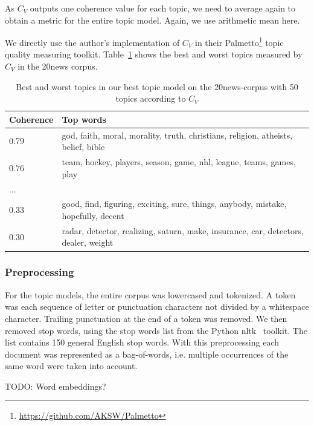 \documentclass[
        a4paper,
        titlepage,
        twoside,
        parskip
        ]{scrbook}
\theoremstyle{break}
\begin{document}
As $C_V$ outputs one coherence value for each topic, we need to average again to obtain a metric for the entire topic model.
Again, we use arithmetic mean here.

We directly use the author's implementation of $C_V$ in their Palmetto\footnote{\url{https://github.com/AKSW/Palmetto}} topic quality measuring toolkit.
Table~\ref{table:best_worst_cv_topics} shows the best and worst topics measured by $C_V$ in the 20news corpus.
\begin{table}[]
  \centering
  \caption{Best and worst topics in our best topic model on the 20news-corpus with 50 topics according to $C_V$}
  \begin{tabular}{ll}
  \hline
  \textbf{Coherence} & \textbf{Top words} \\ \hline
  0.79               & god, faith, moral, morality, truth, christians, religion, atheists, belief, bible \\
  0.76               & team, hockey, players, season, game, nhl, league, teams, games, play \\
  ...                &                    \\
  0.33               & good, find, figuring, exciting, sure, things, anybody, mistake, hopefully, decent \\
  0.30               & radar, detector, realizing, saturn, make, insurance, car, detectors, dealer, weight \\ \hline
  \end{tabular}
  \label{table:best_worst_cv_topics}
\end{table}

\subsubsection{Preprocessing}

For the topic models, the entire corpus was lowercased and tokenized.
A token was each sequence of letter or punctuation characters not divided by a whitespace character.
Trailing punctuation at the end of a token was removed.
We then removed stop words, using the stop words list from the Python nltk~\cite{Bird2009} toolkit.
The list contains 150 general English stop words.
With this preprocessing each document was represented as a bag-of-words, i.e. multiple occurrences of the same word were taken into account.

TODO: Word embeddings?
\end{document}
